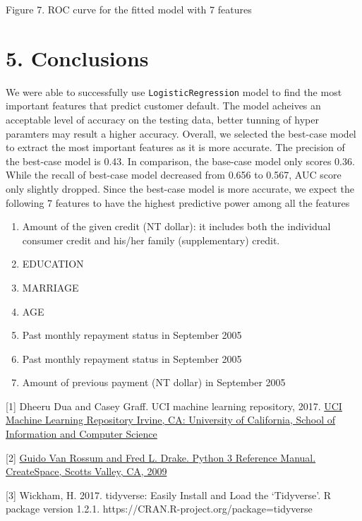 \documentclass[11pt]{article}
\providecommand{\tightlist}{%
      \setlength{\itemsep}{0pt}\setlength{\parskip}{0pt}}
\begin{document}
    Figure 7. ROC curve for the fitted model with 7 features

    \hypertarget{conclusions}{%
\section{5. Conclusions }\label{conclusions}}

We were able to successfully use \texttt{LogisticRegression} model to
find the most important features that predict customer default. The
model acheives an acceptable level of accuracy on the testing data,
better tunning of hyper paramters may result a higher accuracy. Overall,
we selected the best-case model to extract the most important features
as it is more accurate. The precision of the best-case model is 0.43. In
comparison, the base-case model only scores 0.36. While the recall of
best-case model decreased from 0.656 to 0.567, AUC score only slightly
dropped. Since the best-case model is more accurate, we expect the
following 7 features to have the highest predictive power among all the
features

\begin{enumerate}
\def\labelenumi{\arabic{enumi}.}
\tightlist
\item
  Amount of the given credit (NT dollar): it includes both the
  individual consumer credit and his/her family (supplementary) credit.
\item
  EDUCATION
\item
  MARRIAGE
\item
  AGE
\item
  Past monthly repayment status in September 2005
\item
  Past monthly repayment status in September 2005
\item
  Amount of previous payment (NT dollar) in September 2005
\end{enumerate}

    \cite{scipy} \cite{pandas}

    {[}1{]} Dheeru Dua and Casey Graff. UCI machine learning repository,
2017.
\href{https://archive.ics.uci.edu/ml/datasets/default+of+credit+card+clients}{UCI
Machine Learning Repository Irvine, CA: University of California, School
of Information and Computer Science}

{[}2{]} \href{https://dl.acm.org/doi/book/10.5555/1593511}{Guido Van
Rossum and Fred L. Drake. Python 3 Reference Manual. CreateSpace, Scotts
Valley, CA, 2009}

{[}3{]} Wickham, H. 2017. tidyverse: Easily Install and Load the
`Tidyverse'. R package version 1.2.1.
https://CRAN.R-project.org/package=tidyverse
\end{document}
